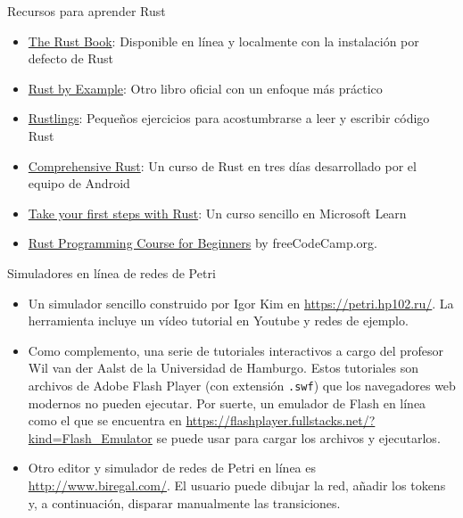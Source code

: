 \documentclass{beamer}
\begin{document}
\begin{frame}{Recursos para aprender Rust}
  \begin{itemize}
    \item \href{https://doc.rust-lang.org/stable/book/}{The Rust Book}:
          Disponible en línea y localmente con la instalación por defecto de Rust
    \item \href{https://doc.rust-lang.org/rust-by-example/}{Rust by Example}:
          Otro libro oficial con un enfoque más práctico
    \item \href{https://github.com/rust-lang/rustlings}{Rustlings}:
          Pequeños ejercicios para acostumbrarse a leer y escribir código Rust
    \item \href{https://google.github.io/comprehensive-rust/}{Comprehensive Rust}:
          Un curso de Rust en tres días desarrollado por el equipo de Android
    \item \href{https://learn.microsoft.com/en-us/training/paths/rust-first-steps/}{Take your first steps with Rust}:
          Un curso sencillo en Microsoft Learn
    \item \href{https://www.youtube.com/watch?v=MsocPEZBd-M}{Rust Programming Course for Beginners} by freeCodeCamp.org.
  \end{itemize}
\end{frame}

\begin{frame}{Simuladores en línea de redes de Petri}
  \begin{itemize}
    \item Un simulador sencillo construido por Igor Kim en \url{https://petri.hp102.ru/}.
          La herramienta incluye un vídeo tutorial en Youtube y redes de ejemplo.
    \item Como complemento, una serie de tutoriales interactivos a cargo del profesor Wil van der Aalst
          de la Universidad de Hamburgo. Estos tutoriales son archivos de Adobe Flash Player (con extensión \texttt{.swf})
          que los navegadores web modernos no pueden ejecutar.
          Por suerte, un emulador de Flash en línea como el que se encuentra en \url{https://flashplayer.fullstacks.net/?kind=Flash_Emulator}
          se puede usar para cargar los archivos y ejecutarlos.
    \item Otro editor y simulador de redes de Petri en línea es \url{http://www.biregal.com/}.
          El usuario puede dibujar la red, añadir los tokens y, a continuación, disparar manualmente las transiciones.
  \end{itemize}
\end{frame}
\end{document}
